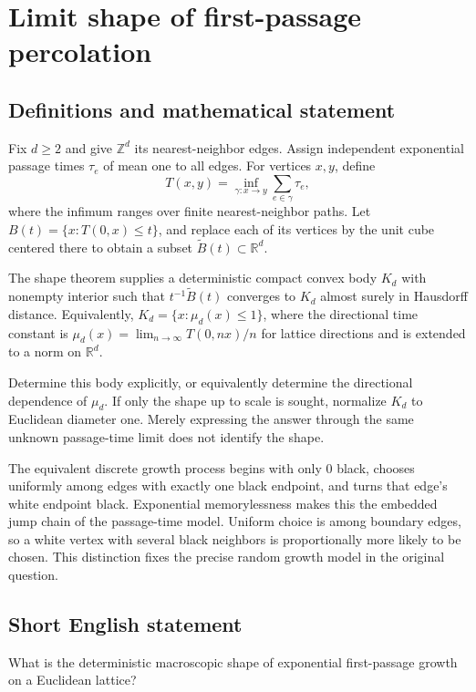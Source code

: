 \documentclass[11pt,a4paper]{article}
\begin{document}
\section*{Limit shape of first-passage percolation}\label{statement}

\subsection{Definitions and mathematical statement}
Fix $d\ge2$ and give $\mathbb Z^d$ its nearest-neighbor edges. Assign independent exponential passage times $\tau_e$ of mean one to all edges. For vertices $x,y$, define
\[
T(x,y)=\inf_{\gamma:x\to y}\sum_{e\in\gamma}\tau_e,
\]
where the infimum ranges over finite nearest-neighbor paths. Let $B(t)=\{x:T(0,x)\le t\}$, and replace each of its vertices by the unit cube centered there to obtain a subset $\widetilde B(t)\subset\mathbb R^d$.

The shape theorem supplies a deterministic compact convex body $K_d$ with nonempty interior such that $t^{-1}\widetilde B(t)$ converges to $K_d$ almost surely in Hausdorff distance. Equivalently, $K_d=\{x:\mu_d(x)\le1\}$, where the directional time constant is $\mu_d(x)=\lim_{n\to\infty}T(0,nx)/n$ for lattice directions and is extended to a norm on $\mathbb R^d$.

Determine this body explicitly, or equivalently determine the directional dependence of $\mu_d$. If only the shape up to scale is sought, normalize $K_d$ to Euclidean diameter one. Merely expressing the answer through the same unknown passage-time limit does not identify the shape.

The equivalent discrete growth process begins with only $0$ black, chooses uniformly among edges with exactly one black endpoint, and turns that edge's white endpoint black. Exponential memorylessness makes this the embedded jump chain of the passage-time model. Uniform choice is among boundary edges, so a white vertex with several black neighbors is proportionally more likely to be chosen. This distinction fixes the precise random growth model in the original question.
\subsection{Short English statement}
What is the deterministic macroscopic shape of exponential first-passage growth on a Euclidean lattice?
\end{document}
